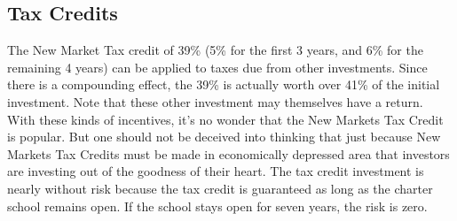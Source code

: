 \subsection{Tax Credits}
The New Market Tax credit of 39\% (5\% for the first 3 years, and 6\% for the remaining 4 years) can be applied to taxes due from other investments. Since there is a compounding effect, the 39\% is actually worth over 41\% of the initial investment. Note that these other investment may themselves have a return. With these kinds of incentives, it's no wonder that the New Markets Tax Credit is popular. But one should not be deceived into thinking that just because New Markets Tax Credits must be made in economically depressed area that investors are investing out of the goodness of their heart. The tax credit investment is nearly without risk because the tax credit is guaranteed as long as the charter school remains open. If the school stays open for seven years, the risk is zero.

